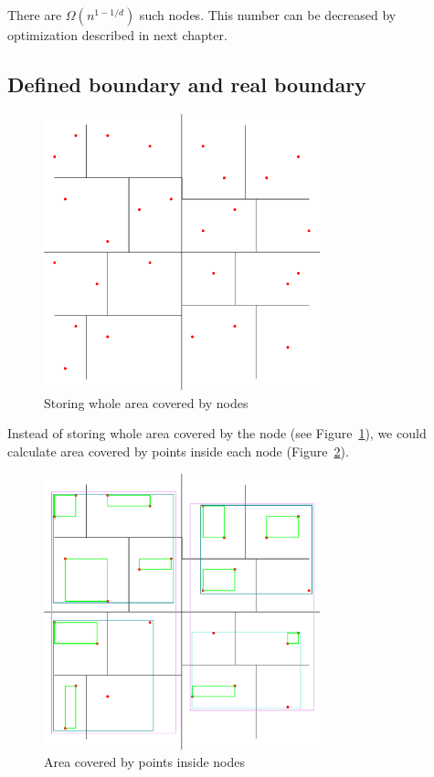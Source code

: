 \documentclass[10pt,a4paper]{article}
\begin{document}
There are $\Omega (n^{1-1/d})$ such nodes. This number can be decreased by optimization described in next chapter.

\subsection{Defined boundary and real boundary}

\begin{figure}
\centering
  \includegraphics[width=8cm]{Figure1}
  \caption{Storing whole area covered by nodes}
  \label{fig:covered}
\end{figure}

Instead of storing whole area covered by the node (see Figure~\ref{fig:covered}), we could calculate area covered by points inside each node (Figure~\ref{fig:inside}).

\begin{figure}
\centering
  \includegraphics[width=8cm]{Figure2}
  \caption{Area covered by points inside nodes}
  \label{fig:inside}
\end{figure}
\end{document}
